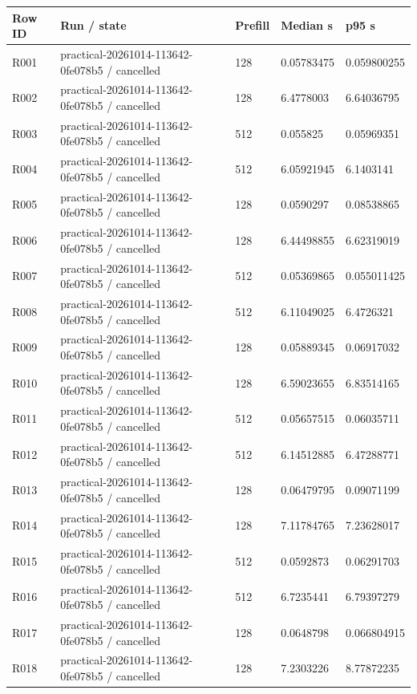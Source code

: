 \documentclass[10pt]{article}
\begin{document}
{\scriptsize\setlength{\tabcolsep}{2pt}
\begin{longtable}{p{}p{}p{}p{}p{}}
Row ID & Run / state & Prefill & Median s & p95 s \\
\hline\endhead
R001 & practical-20261014-113642-0fe078b5 / cancelled & 128 & 0.05783475 & 0.059800255 \\
R002 & practical-20261014-113642-0fe078b5 / cancelled & 128 & 6.4778003 & 6.64036795 \\
R003 & practical-20261014-113642-0fe078b5 / cancelled & 512 & 0.055825 & 0.05969351 \\
R004 & practical-20261014-113642-0fe078b5 / cancelled & 512 & 6.05921945 & 6.1403141 \\
R005 & practical-20261014-113642-0fe078b5 / cancelled & 128 & 0.0590297 & 0.08538865 \\
R006 & practical-20261014-113642-0fe078b5 / cancelled & 128 & 6.44498855 & 6.62319019 \\
R007 & practical-20261014-113642-0fe078b5 / cancelled & 512 & 0.05369865 & 0.055011425 \\
R008 & practical-20261014-113642-0fe078b5 / cancelled & 512 & 6.11049025 & 6.4726321 \\
R009 & practical-20261014-113642-0fe078b5 / cancelled & 128 & 0.05889345 & 0.06917032 \\
R010 & practical-20261014-113642-0fe078b5 / cancelled & 128 & 6.59023655 & 6.83514165 \\
R011 & practical-20261014-113642-0fe078b5 / cancelled & 512 & 0.05657515 & 0.06035711 \\
R012 & practical-20261014-113642-0fe078b5 / cancelled & 512 & 6.14512885 & 6.47288771 \\
R013 & practical-20261014-113642-0fe078b5 / cancelled & 128 & 0.06479795 & 0.09071199 \\
R014 & practical-20261014-113642-0fe078b5 / cancelled & 128 & 7.11784765 & 7.23628017 \\
R015 & practical-20261014-113642-0fe078b5 / cancelled & 512 & 0.0592873 & 0.06291703 \\
R016 & practical-20261014-113642-0fe078b5 / cancelled & 512 & 6.7235441 & 6.79397279 \\
R017 & practical-20261014-113642-0fe078b5 / cancelled & 128 & 0.0648798 & 0.066804915 \\
R018 & practical-20261014-113642-0fe078b5 / cancelled & 128 & 7.2303226 & 8.77872235 \\

\end{longtable}}
\end{document}
